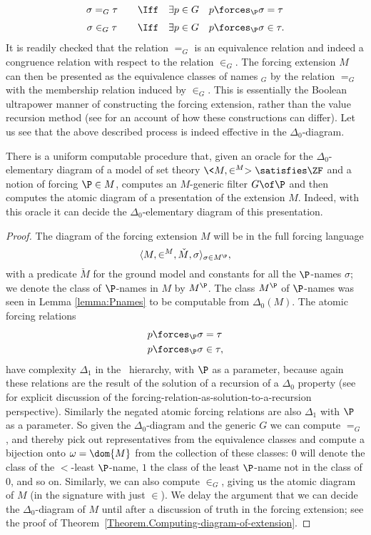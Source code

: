 \documentclass{amsart}
\begin{document}
$$\begin{array}{cl}
\sigma =_G \tau\quad &\Iff \quad \exists p\in G\quad p\forces_\P \sigma=\tau \medskip\\ \sigma \in_G \tau\quad &\Iff \quad \exists p\in G\quad p\forces_\P \sigma\in\tau.\\ \end{array}
$$
It is readily checked that the relation $=_G$ is an equivalence relation and indeed a congruence relation with respect to the relation $\in_G$. The forcing extension $M$ can then be presented as the equivalence classes of names $_G$ by the relation $=_G$ with the membership relation induced by $\in_G$. This is essentially the Boolean ultrapower manner of constructing the forcing extension, rather than the value recursion method (see \cite{HamkinsSeabold:BooleanUltrapowers} for an account of how these constructions can differ).
Let us see that the above described process is indeed effective in the $\Delta_0$-diagram.
\begin{theorem}\label{Theorem.Computing-atomic-diagram-of-extension}
There is a uniform computable procedure that, given an oracle for the $\Delta_0$-elementary diagram of a model of set theory $\<M,\in^M> \satisfies \ZF$ and a notion of forcing $\P \in M$, computes an $M$-generic filter $G \of \P$ and then computes the atomic diagram of a presentation of the extension $M$. Indeed, with this oracle it can decide the $\Delta_0$-elementary diagram of this presentation.
\end{theorem}
\begin{proof}
The diagram of the forcing extension $M$ will be in the full forcing language
$$\langle M,\in^{M},\check M,\sigma\rangle_{\sigma\in M^\P},$$
with a predicate $\check M$ for the ground model and constants for all the $\P$-names $\sigma$; we denote the class of $\P$-names in $M$ by $M^\P$. The class $M^\P$ of $\P$-names was seen in Lemma \ref{lemma:Pnames}
to be computable from $\Delta_0(M)$.
The atomic forcing relations
\begin{align*}
p &\forces_\P \sigma = \tau \\ p &\forces_\P \sigma \in \tau,
\end{align*}
have complexity $\Delta_1$ in the \Levy\ hierarchy, with $\P$ as a parameter, because again these relations are the result of the solution of a recursion of a $\Delta_0$ property (see \cite{GHHSW:to-appear} for explicit discussion of the forcing-relation-as-solution-to-a-recursion perspective). Similarly the negated atomic forcing relations are also $\Delta_1$ with $\P$ as a parameter.
So given the $\Delta_0$-diagram and the generic $G$ we can compute $=_G$, and thereby pick out representatives from the equivalence classes and compute a bijection onto $\omega=\dom{M}$ from the collection of these classes: $0$ will
denote the class of the $<$-least $\P$-name, $1$ the class of the least $\P$-name not in the class of $0$, and so on. Similarly, we can also compute $\in_G$, giving us the atomic diagram of $M$ (in the signature with just $\in$).
We delay the argument that we can decide the $\Delta_0$-diagram of $M$ until after a discussion of truth in the forcing extension; see the proof of Theorem~\ref{Theorem.Computing-diagram-of-extension}.
\end{proof}
\end{document}
